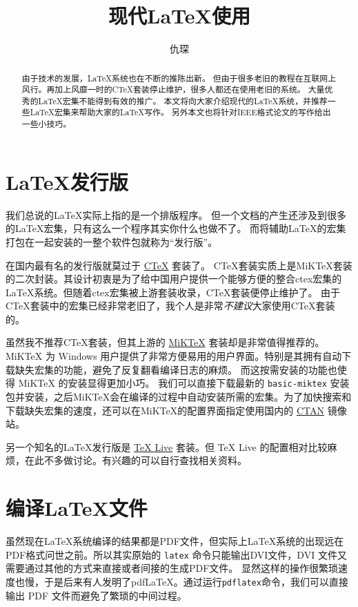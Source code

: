 \documentclass[zihao=-4]{ctexart}
\title{现代{\LaTeX}使用}
\author{仇琛}
\begin{document}
    \maketitle
    \begin{abstract}
        由于技术的发展，{\LaTeX}系统也在不断的推陈出新。
        但由于很多老旧的教程在互联网上风行。再加上风靡一时的CTeX套装停止维护，很多人都还在使用老旧的系统。
        大量优秀的{\LaTeX}宏集不能得到有效的推广。
        本文将向大家介绍现代的{\LaTeX}系统，并推荐一些{\LaTeX}宏集来帮助大家的{\LaTeX}写作。
        另外本文也将针对IEEE格式论文的写作给出一些小技巧。
    \end{abstract}
    \section{{\LaTeX}发行版}
    我们总说的{\LaTeX}实际上指的是一个排版程序。
    但一个文档的产生还涉及到很多的{\LaTeX}宏集，只有这么一个程序其实你什么也做不了。
    而将辅助{\LaTeX}的宏集打包在一起安装的一整个软件包就称为“发行版”。

    在国内最有名的发行版就莫过于 \href{http://www.ctex.org/HomePage}{CTeX} 套装了。
    CTeX套装实质上是MiKTeX套装的二次封装。其设计初衷是为了给中国用户提供一个能够方便的整合ctex宏集的{\LaTeX}系统。但随着ctex宏集被上游套装收录，CTeX套装便停止维护了。
    由于CTeX套装中的宏集已经非常老旧了，我个人是非常\emph{不建议}大家使用CTeX套装的。

    虽然我不推荐CTeX套装，但其上游的 \href{https://miktex.org/}{MiKTeX} 套装却是非常值得推荐的。
    MiKTeX 为 Windows 用户提供了非常方便易用的用户界面。特别是其拥有自动下载缺失宏集的功能，避免了反复翻看编译日志的麻烦。
    而这按需安装的功能也使得 MiKTeX 的安装显得更加小巧。
    我们可以直接下载最新的 \texttt{basic-miktex} 安装包并安装，之后MiKTeX会在编译的过程中自动安装所需的宏集。为了加快搜索和下载缺失宏集的速度，还可以在MiKTeX的配置界面指定使用国内的 \href{https://mirrors.tuna.tsinghua.edu.cn/CTAN/}{CTAN} 镜像站。

    另一个知名的{\LaTeX}发行版是 \href{https://www.tug.org/texlive/}{TeX Live} 套装。但 TeX Live 的配置相对比较麻烦，在此不多做讨论。有兴趣的可以自行查找相关资料。

    \section{编译{\LaTeX}文件}

    虽然现在{\LaTeX}系统编译的结果都是PDF文件，但实际上{\LaTeX}系统的出现远在PDF格式问世之前。所以其实原始的 \texttt{latex} 命令只能输出DVI文件，DVI 文件又需要通过其他的方式来直接或者间接的生成PDF文件。
    显然这样的操作很繁琐速度也慢，于是后来有人发明了pdfLaTeX。通过运行\texttt{pdflatex}命令，我们可以直接输出 PDF 文件而避免了繁琐的中间过程。
\end{document}
